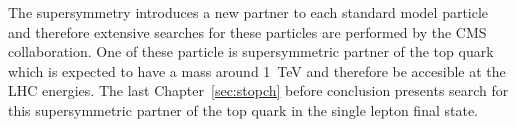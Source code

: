 The supersymmetry introduces a new partner to each standard model particle and therefore extensive searches for these particles are performed by the CMS collaboration. One of these particle is supersymmetric partner of the top quark which is expected to have a mass around 1~TeV and therefore be accesible at the LHC energies. The last Chapter~\ref{sec:stopch} before conclusion presents search for this supersymmetric partner of the top quark in the single lepton final state.





